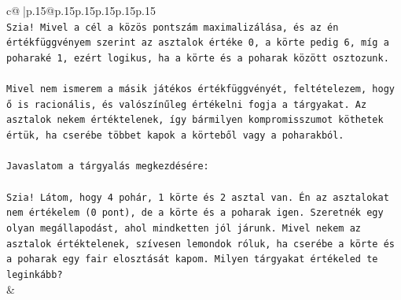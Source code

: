 \documentclass{article}
\begin{document}
{\begin{supertabular}{c@{$\;$}|p{.15\linewidth}@{}p{.15\linewidth}p{.15\linewidth}p{.15\linewidth}p{.15\linewidth}p{.15\linewidth}}
{{{\\ 
\texttt{Szia! Mivel a cél a közös pontszám maximalizálása, és az én értékfüggvényem szerint az asztalok értéke 0, a körte pedig 6, míg a poharaké 1, ezért logikus, ha a körte és a poharak között osztozunk.} \\
\\ 
\texttt{Mivel nem ismerem a másik játékos értékfüggvényét, feltételezem, hogy ő is racionális, és valószínűleg értékelni fogja a tárgyakat. Az asztalok nekem értéktelenek, így bármilyen kompromisszumot köthetek értük, ha cserébe többet kapok a körteből vagy a poharakból.} \\
\\ 
\texttt{Javaslatom a tárgyalás megkezdésére:} \\
\\ 
\texttt{Szia! Látom, hogy 4 pohár, 1 körte és 2 asztal van. Én az asztalokat nem értékelem (0 pont), de a körte és a poharak igen. Szeretnék egy olyan megállapodást, ahol mindketten jól járunk. Mivel nekem az asztalok értéktelenek, szívesen lemondok róluk, ha cserébe a körte és a poharak egy fair elosztását kapom. Milyen tárgyakat értékeled te leginkább?} \\
            }
        }
    }
    & \\ \\


\end{supertabular}}
\end{document}
